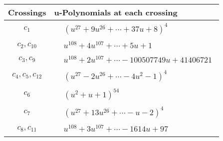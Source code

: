 \documentclass[1p]{elsarticle_modified}
\theoremstyle{definition}
\begin{document}
\begin{tabular}{m{50pt}|m{274pt}}
Crossings & \hspace{64pt}u-Polynomials at each crossing \\
\hline $$\begin{aligned}c_{1}\end{aligned}$$&$\begin{aligned}
&(u^{27}+9 u^{26}+\cdots+37 u+8)^{4}
\end{aligned}$\\
\hline $$\begin{aligned}c_{2},c_{10}\end{aligned}$$&$\begin{aligned}
&u^{108}+4 u^{107}+\cdots+5 u+1
\end{aligned}$\\
\hline $$\begin{aligned}c_{3},c_{9}\end{aligned}$$&$\begin{aligned}
&u^{108}+2 u^{107}+\cdots-100507749 u+41406721
\end{aligned}$\\
\hline $$\begin{aligned}c_{4},c_{5},c_{12}\end{aligned}$$&$\begin{aligned}
&(u^{27}-2 u^{26}+\cdots-4 u^2-1)^{4}
\end{aligned}$\\
\hline $$\begin{aligned}c_{6}\end{aligned}$$&$\begin{aligned}
&(u^2+u+1)^{54}
\end{aligned}$\\
\hline $$\begin{aligned}c_{7}\end{aligned}$$&$\begin{aligned}
&(u^{27}+13 u^{26}+\cdots- u-2)^{4}
\end{aligned}$\\
\hline $$\begin{aligned}c_{8},c_{11}\end{aligned}$$&$\begin{aligned}
&u^{108}+3 u^{107}+\cdots-1614 u+97
\end{aligned}$\\
\hline
\end{tabular}\\~\\
\newpage\renewcommand{\arraystretch}{1}
\end{document}
